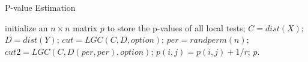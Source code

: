\documentclass[11pt]{article}
\begin{document}
\begin{algorithm}
\caption{P-value Estimation}
\label{algPerm}
\begin{algorithmic}
\State initialize an $n \times n$ matrix $p$ to store the p-values of all local tests;
\State $C=dist(X)$; $D=dist(Y)$; 
\State $cut=LGC(C,D,option)$; 
\State $per=randperm(n)$; 
\State $cut2=LGC(C,D(per,per),option)$; 
\State $p(i,j)=p(i,j)+1/r$;
\EndIf
\EndFor
\EndFor
\EndFor
\State \Return $p$.
\EndFunction
\end{algorithmic}
\end{algorithm}
\end{document}
